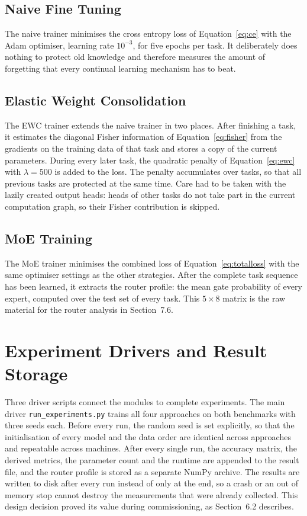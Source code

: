 \subsection{Naive Fine Tuning}

The naive trainer minimises the cross entropy loss of
Equation~\eqref{eq:ce} with the Adam optimiser, learning rate $10^{-3}$,
for five epochs per task. It deliberately does nothing to protect old
knowledge and therefore measures the amount of forgetting that every
continual learning mechanism has to beat.

\subsection{Elastic Weight Consolidation}

The EWC trainer extends the naive trainer in two places. After finishing a
task, it estimates the diagonal Fisher information of
Equation~\eqref{eq:fisher} from the gradients on the training data of that
task and stores a copy of the current parameters. During every later task,
the quadratic penalty of Equation~\eqref{eq:ewc} with $\lambda = 500$ is
added to the loss. The penalty accumulates over tasks, so that all previous
tasks are protected at the same time. Care had to be taken with the lazily
created output heads: heads of other tasks do not take part in the current
computation graph, so their Fisher contribution is skipped.

\subsection{MoE Training}

The MoE trainer minimises the combined loss of
Equation~\eqref{eq:totalloss} with the same optimiser settings as the other
strategies. After the complete task sequence has been learned, it extracts
the router profile: the mean gate probability of every expert, computed
over the test set of every task. This $5 \times 8$ matrix is the raw
material for the router analysis in Section~7.6.

\section{Experiment Drivers and Result Storage}
\label{sec:impldrivers}

Three driver scripts connect the modules to complete experiments. The main
driver \texttt{run\_experiments.py} trains all four approaches on both
benchmarks with three seeds each. Before every run, the random seed is set
explicitly, so that the initialisation of every model and the data order
are identical across approaches and repeatable across machines. After every
single run, the accuracy matrix, the derived metrics, the parameter count
and the runtime are appended to the result file, and the router profile is
stored as a separate NumPy archive. The results are written to disk after
every run instead of only at the end, so a crash or an out of memory stop
cannot destroy the measurements that were already collected. This design
decision proved its value during commissioning, as Section~6.2 describes.


